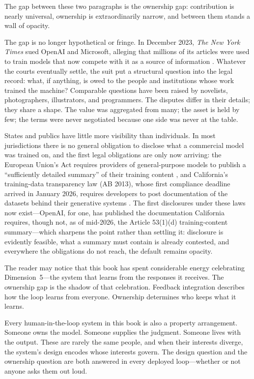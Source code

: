 The gap between these two paragraphs is the ownership gap: contribution is nearly universal, ownership is extraordinarily narrow, and between them stands a wall of opacity.

The gap is no longer hypothetical or fringe. In December 2023, \textit{The New York Times} sued OpenAI and Microsoft, alleging that millions of its articles were used to train models that now compete with it as a source of information \autocite{grynbaum2023lawsuit}. Whatever the courts eventually settle, the suit put a structural question into the legal record: what, if anything, is owed to the people and institutions whose work trained the machine? Comparable questions have been raised by novelists, photographers, illustrators, and programmers. The disputes differ in their details; they share a shape. The value was aggregated from many; the asset is held by few; the terms were never negotiated because one side was never at the table.

States and publics have little more visibility than individuals. In most jurisdictions there is no general obligation to disclose what a commercial model was trained on, and the first legal obligations are only now arriving: the European Union's \ai Act requires providers of general-purpose models to publish a ``sufficiently detailed summary'' of their training content \autocite{euaiact2024}, and California's training-data transparency law (AB 2013), whose first compliance deadline arrived in January 2026, requires developers to post documentation of the datasets behind their generative systems \autocite{ab2013california}. The first disclosures under these laws now exist---OpenAI, for one, has published the documentation California requires, though not, as of mid-2026, the Article 53(1)(d) training-content summary---which sharpens the point rather than settling it: disclosure is evidently feasible, what a summary must contain is already contested, and everywhere the obligations do not reach, the default remains opacity.

The reader may notice that this book has spent considerable energy celebrating Dimension~5---the system that learns from the responses it receives. The ownership gap is the shadow of that celebration. Feedback integration describes how the loop learns from everyone. Ownership determines who keeps what it learns.

\begin{keyconcept}
Every human-in-the-loop system in this book is also a property arrangement. Someone owns the model. Someone supplies the judgment. Someone lives with the output. These are rarely the same people, and when their interests diverge, the system's design encodes whose interests govern. The design question and the ownership question are both answered in every deployed loop---whether or not anyone asks them out loud.
\end{keyconcept}

